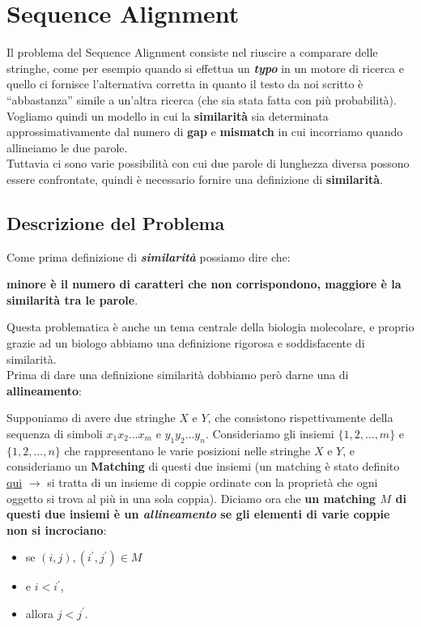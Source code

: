 \chapter{Sequence Alignment}

Il problema del Sequence Alignment consiste nel riuscire a comparare
delle stringhe, come per esempio quando si effettua un
\textbf{\emph{typo}} in un motore di ricerca e quello ci fornisce
l'alternativa corretta in quanto il testo da noi scritto è
``abbastanza'' simile a un'altra ricerca (che sia stata fatta con più
probabilità).\\ Vogliamo quindi un modello in cui la \textbf{similarità}
sia determinata approssimativamente dal numero di \textbf{gap} e
\textbf{mismatch} in cui incorriamo quando allineiamo le due parole.\\
Tuttavia ci sono varie possibilità con cui due parole di lunghezza
diversa possono essere confrontate, quindi è necessario fornire una
definizione di \textbf{similarità}.

\section{Descrizione del Problema}

Come prima definizione di \textbf{\emph{similarità}} possiamo dire che:
\begin{myblockquote}
  \textbf{minore è il numero di caratteri che non
    corrispondono, maggiore è la similarità tra le parole}.
\end{myblockquote}

Questa problematica è anche un tema centrale della biologia molecolare,
e proprio grazie ad un biologo abbiamo una definizione rigorosa e
soddisfacente di similarità.\\

Prima di dare una definizione similarità dobbiamo però darne una di
\textbf{allineamento}:
\begin{myblockquote}
  Supponiamo di avere due stringhe
  $X$ e $Y$, che consistono rispettivamente della sequenza di simboli
  $x_1 x_2 \ldots x_m$ e $y_1 y_2 \ldots y_n$.
  Consideriamo gli insiemi $\{1,2,\ldots ,m\}$ e $\{1,2,\ldots ,n\}$
  che rappresentano le varie posizioni nelle stringhe $X$ e $Y$, e
  consideriamo un \textbf{Matching} di questi due insiemi (un matching è
  stato definito \protect\hyperlink{rna-secondary-stucture-problem}{qui}
  $\rightarrow$ si tratta di un insieme di coppie ordinate con la
  proprietà che ogni oggetto si trova al più in una sola coppia).
  Diciamo ora che \textbf{un matching $M$ di questi due
    insiemi è un \emph{allineamento} se gli elementi di varie coppie non si
    incrociano}:
    \begin{itemize}
        \item se $(i,j),(i^{\prime},j^{\prime}) \in M$
        \item e $i < i^{\prime}$,
        \item allora $j < j^{\prime}$.
    \end{itemize}
\end{myblockquote}

